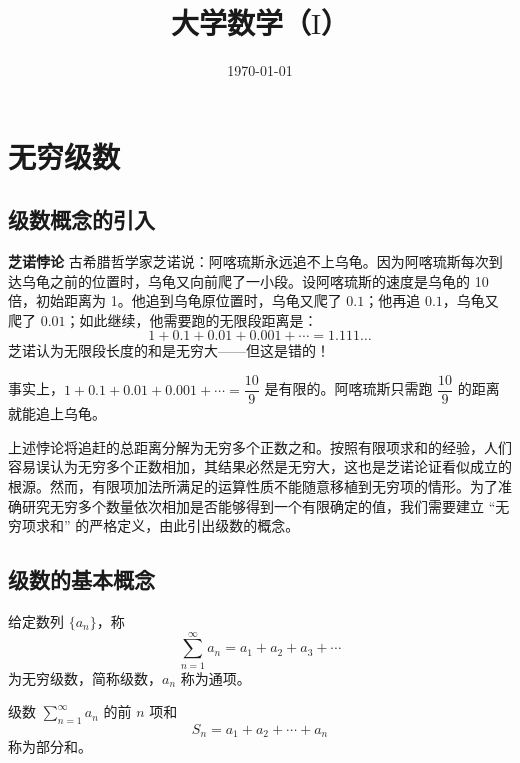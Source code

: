 \documentclass[fontset=fandol]{ctexart}
\title{大学数学（$ \mathrm{I} $）}
\author{}
\date{\today}
\newenvironment{custom}[1]{\par\noindent\textbf{#1}\quad}{\par\vspace{0.8em}}
\begin{document}
\maketitle
\vspace{-1em}



\section{无穷级数}

\subsection*{级数概念的引入}

\begin{custom}{芝诺悖论}
古希腊哲学家芝诺说：阿喀琉斯永远追不上乌龟。因为阿喀琉斯每次到达乌龟之前的位置时，乌龟又向前爬了一小段。设阿喀琉斯的速度是乌龟的 10 倍，初始距离为 1。他追到乌龟原位置时，乌龟又爬了 \(0.1\)；他再追 \(0.1\)，乌龟又爬了 \(0.01\)；如此继续，他需要跑的无限段距离是：
\[
1 + 0.1 + 0.01 + 0.001 + \cdots = 1.111\ldots
\]
芝诺认为无限段长度的和是无穷大——但这是错的！

事实上，\(1 + 0.1 + 0.01 + 0.001 + \cdots = \dfrac{10}{9}\) 是有限的。阿喀琉斯只需跑 \(\dfrac{10}{9}\) 的距离就能追上乌龟。
\end{custom}

上述悖论将追赶的总距离分解为无穷多个正数之和。按照有限项求和的经验，人们容易误认为无穷多个正数相加，其结果必然是无穷大，这也是芝诺论证看似成立的根源。然而，有限项加法所满足的运算性质不能随意移植到无穷项的情形。为了准确研究无穷多个数量依次相加是否能够得到一个有限确定的值，我们需要建立 “无穷项求和” 的严格定义，由此引出级数的概念。




\subsection{级数的基本概念}




\begin{definition}[常数项级数]
给定数列 \(\{a_n\}\)，称
\[
\sum_{n=1}^{\infty} a_n = a_1 + a_2 + a_3 + \cdots
\]
为无穷级数，简称级数，\(a_n\) 称为通项。
\end{definition}

\begin{definition}[部分和]
级数 \(\sum\limits_{n = 1}^{  \infty }  a_n\) 的前 \(n\) 项和
\[
S_n = a_1 + a_2 + \cdots + a_n
\]
称为部分和。
\end{definition}
\end{document}
